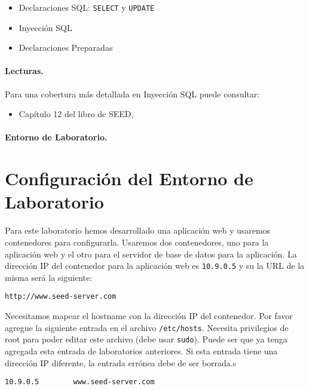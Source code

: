 \begin{itemize}[noitemsep]
\item Declaraciones SQL: \texttt{SELECT} y \texttt{UPDATE}
\item Inyección SQL
\item Declaraciones Preparadas
\end{itemize}



\paragraph{Lecturas.}
Para una cobertura más detallada en Inyección SQL puede consultar:

\begin{itemize}
\item Capítulo 12 del libro de SEED, \seedbook
\end{itemize}

\paragraph{Entorno de Laboratorio.} 
\seedenvironmentB 
\nodependency


\section{Configuración del Entorno de Laboratorio}

Para este laboratorio hemos desarrollado una aplicación web y usaremos contenedores para configurarla. Usaremos dos contenedores, uno para la aplicación web y el otro para el servidor de base de datos para la aplicación.
La dirección IP del contenedor para la aplicación web es \texttt{10.9.0.5} y su la URL de la misma será la siguiente:

\begin{lstlisting}
http://www.seed-server.com
\end{lstlisting}

Necesitamos mapear el hostname con la dirección IP del contenedor. Por favor agregue la siguiente entrada en el archivo  \texttt{/etc/hosts}. Necesita privilegios de root para poder editar este archivo (debe usar \texttt{sudo}).
Puede ser que ya tenga agregada esta entrada de laboratorios anteriores. Si esta entrada tiene una dirección IP diferente, la entrada errónea debe de ser borrada.s

\begin{lstlisting}
10.9.0.5        www.seed-server.com
\end{lstlisting}
 


